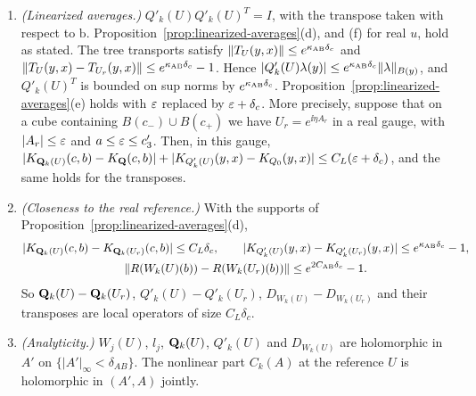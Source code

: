 \begin{proposition}
\begin{enumerate}[label=(\roman*)]
\item \emph{(Linearized averages.)} $Q'_k(U)Q'_k(U)^T=I$, with the transpose taken with respect to $\mathrm b$. Proposition~\ref{prop:linearized-averages}(d), and (f) for real $u$, hold as stated. The tree transports satisfy $\|T_U(y,x)\|\le e^{\kappa_{\rm AB}\delta_c}$ and $\|T_U(y,x)-T_{U_r}(y,x)\|\le e^{\kappa_{\rm AB}\delta_c}-1$. Hence $|Q'_k(U)\lambda(y)|\le e^{\kappa_{\rm AB}\delta_c}\|\lambda\|_{B(y)}$, and $Q'_k(U)^T$ is bounded on sup norms by $e^{\kappa_{\rm AB}\delta_c}$. Proposition~\ref{prop:linearized-averages}(e) holds with $\varepsilon$ replaced by $\varepsilon+\delta_c$. More precisely, suppose that on a cube containing $B(c_-)\cup B(c_+)$ we have $U_r=e^{\ii\eta A_r}$ in a real gauge, with $|A_r|\le\varepsilon$ and $a\le\varepsilon\le c'_3$. Then, in this gauge, $|K_{\mathbf Q_k(U)}(c,b)-K_{\mathbf Q}(c,b)|+|K_{Q'_k(U)}(y,x)-K_{Q_0}(y,x)|\le C_L(\varepsilon+\delta_c)$, and the same holds for the transposes.
\item \emph{(Closeness to the real reference.)} With the supports of Proposition~\ref{prop:linearized-averages}(d),
\begin{gather*}
|K_{\mathbf Q_k(U)}(c,b)-K_{\mathbf Q_k(U_r)}(c,b)|\le C_L\delta_c,\qquad |K_{Q'_k(U)}(y,x)-K_{Q'_k(U_r)}(y,x)|\le e^{\kappa_{\rm AB}\delta_c}-1,\\
\|R(W_k(U)(b))-R(W_k(U_r)(b))\|\le e^{2C_{\rm AB}\delta_c}-1 .
\end{gather*}
So $\mathbf Q_k(U)-\mathbf Q_k(U_r)$, $Q'_k(U)-Q'_k(U_r)$, $D_{W_k(U)}-D_{W_k(U_r)}$ and their transposes are local operators of size $C_L\delta_c$.
\item \emph{(Analyticity.)} $W_j(U)$, $l_j$, $\mathbf Q_k(U)$, $Q'_k(U)$ and $D_{W_k(U)}$ are holomorphic in $A'$ on $\{|A'|_\infty<\delta_{AB}\}$. The nonlinear part $C_k(A)$ at the reference $U$ is holomorphic in $(A',A)$ jointly.
\end{enumerate}
\end{proposition}

